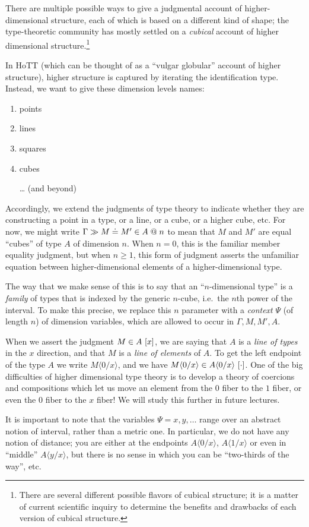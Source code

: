 \documentclass{article}
\newcommand\DimSubst[3]{#3\langle{#1}/{#2}\rangle}
\begin{document}
There are multiple possible ways to give a judgmental account of
higher-dimensional structure, each of which is based on a different
kind of shape; the type-theoretic community has mostly settled on a
\emph{cubical} account of higher dimensional structure.\footnote{There
  are several different possible flavors of cubical structure; it is a
  matter of current scientific inquiry to determine the benefits and
  drawbacks of each version of cubical structure.}

In HoTT (which can be thought of as a ``vulgar globular'' account of
higher structure), higher structure is captured by iterating the
identification type. Instead, we want to give these dimension levels
names:

\begin{enumerate}
\item points
\item lines
\item squares
\item cubes
\item[\ldots] (and beyond)
\end{enumerate}

Accordingly, we extend the judgments of type theory to indicate
whether they are constructing a point in a type, or a line, or a cube,
or a higher cube, etc. For now, we might write
$\hasEEC{\Gamma}{M}{M'}{A}\mathrel{@}n$ to mean that $M$ and $M'$ are
equal ``cubes'' of type $A$ of dimension $n$. When $n=0$, this is the
familiar member equality judgment, but when $n\geq 1$, this form of
judgment asserts the unfamiliar equation between higher-dimensional
elements of a higher-dimensional type.

The way that we make sense of this is to say that an ``$n$-dimensional
type'' is a \emph{family} of types that is indexed by the generic
$n$-cube, i.e.\ the $n$th power of the interval. To make this precise,
we replace this $n$ parameter with a \emph{context} $\Psi$ (of length
$n$) of dimension variables, which are allowed to occur in
$\Gamma,M,M',A$.

When we assert the judgment $\hasEC{M}{A}\ [x]$, we are saying that
$A$ is a \emph{line of types} in the $x$ direction, and that $M$ is a
\emph{line of elements} of $A$. To get the left endpoint of the type
$A$ we write $\DimSubst{0}{x}{M}$, and we have
$\hasEC{\DimSubst{0}{x}{M}}{\DimSubst{0}{x}{A}}\ [\cdot]$. One of the
big difficulties of higher dimensional type theory is to develop a
theory of coercions and compositions which let us move an element from
the $0$ fiber to the $1$ fiber, or even the $0$ fiber to the $x$
fiber! We will study this further in future lectures.

It is important to note that the variables $\Psi=x,y,\ldots$ range
over an abstract notion of interval, rather than a metric one. In
particular, we do not have any notion of distance; you are either at
the endpoints $\DimSubst{0}{x}{A}$, $\DimSubst{1}{x}{A}$ or even in
``middle'' $\DimSubst{y}{x}{A}$, but there is no sense in which you
can be ``two-thirds of the way'', etc.

\nocite{HoTTBook:13}


\end{document}
